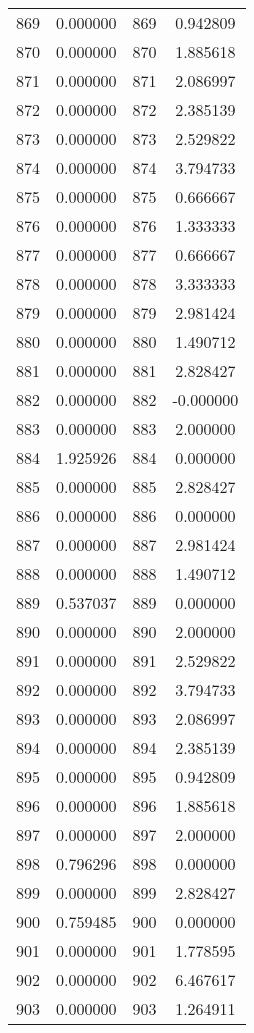 \documentclass[12pt]{article}
\begin{document}
\begin{longtable}{@{}cccc@{}}
869 & 0.000000 & 869 & 0.942809 \\
870 & 0.000000 & 870 & 1.885618 \\
871 & 0.000000 & 871 & 2.086997 \\
872 & 0.000000 & 872 & 2.385139 \\
873 & 0.000000 & 873 & 2.529822 \\
874 & 0.000000 & 874 & 3.794733 \\
875 & 0.000000 & 875 & 0.666667 \\
876 & 0.000000 & 876 & 1.333333 \\
877 & 0.000000 & 877 & 0.666667 \\
878 & 0.000000 & 878 & 3.333333 \\
879 & 0.000000 & 879 & 2.981424 \\
880 & 0.000000 & 880 & 1.490712 \\
881 & 0.000000 & 881 & 2.828427 \\
882 & 0.000000 & 882 & -0.000000 \\
883 & 0.000000 & 883 & 2.000000 \\
884 & 1.925926 & 884 & 0.000000 \\
885 & 0.000000 & 885 & 2.828427 \\
886 & 0.000000 & 886 & 0.000000 \\
887 & 0.000000 & 887 & 2.981424 \\
888 & 0.000000 & 888 & 1.490712 \\
889 & 0.537037 & 889 & 0.000000 \\
890 & 0.000000 & 890 & 2.000000 \\
891 & 0.000000 & 891 & 2.529822 \\
892 & 0.000000 & 892 & 3.794733 \\
893 & 0.000000 & 893 & 2.086997 \\
894 & 0.000000 & 894 & 2.385139 \\
895 & 0.000000 & 895 & 0.942809 \\
896 & 0.000000 & 896 & 1.885618 \\
897 & 0.000000 & 897 & 2.000000 \\
898 & 0.796296 & 898 & 0.000000 \\
899 & 0.000000 & 899 & 2.828427 \\
900 & 0.759485 & 900 & 0.000000 \\
901 & 0.000000 & 901 & 1.778595 \\
902 & 0.000000 & 902 & 6.467617 \\
903 & 0.000000 & 903 & 1.264911 \\

\end{longtable}
\end{document}
